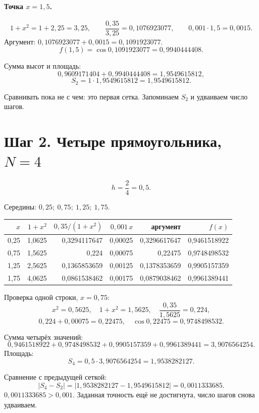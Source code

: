 \documentclass[11pt,a4paper]{article}
\begin{document}
\paragraph{Точка \(x = 1{,}5\).}
\[
1 + x^{2} = 1 + 2{,}25 = 3{,}25,
\qquad
\frac{0{,}35}{3{,}25} = 0{,}1076923077,
\qquad
0{,}001 \cdot 1{,}5 = 0{,}0015.
\]
Аргумент: \(0{,}1076923077 + 0{,}0015 = 0{,}1091923077\).
\[
f(1{,}5) = \cos 0{,}1091923077 = 0{,}9940444408.
\]

Сумма высот и площадь:
\[
0{,}9609171404 + 0{,}9940444408 = 1{,}9549615812,
\]
\[
S_{2} = 1 \cdot 1{,}9549615812 = 1{,}9549615812.
\]

Сравнивать пока не с чем: это первая сетка. Запоминаем \(S_{2}\) и удваиваем число шагов.

\section*{Шаг 2. Четыре прямоугольника, \(N = 4\)}

\[
h = \frac{2}{4} = 0{,}5.
\]

Середины: \(0{,}25;\ 0{,}75;\ 1{,}25;\ 1{,}75\).

{\small
\begin{center}
\begin{tabular}{@{}r r r r r r@{}}
\toprule
\(x\) & \(1+x^{2}\) & \(0{,}35/(1+x^{2})\) & \(0{,}001\,x\) & аргумент & \(f(x)\) \\
\midrule
0,25 & 1,0625 & 0,3294117647 & 0,00025 & 0,3296617647 & 0,9461518922 \\
0,75 & 1,5625 & 0,224 & 0,00075 & 0,22475 & 0,9748498532 \\
1,25 & 2,5625 & 0,1365853659 & 0,00125 & 0,1378353659 & 0,9905157359 \\
1,75 & 4,0625 & 0,0861538462 & 0,00175 & 0,0879038462 & 0,9961389441 \\
\bottomrule
\end{tabular}
\end{center}
}

Проверка одной строки, \(x = 0{,}75\):
\[
x^{2} = 0{,}5625,\quad 1 + x^{2} = 1{,}5625,\quad \frac{0{,}35}{1{,}5625} = 0{,}224,
\]
\[
0{,}224 + 0{,}00075 = 0{,}22475,\quad \cos 0{,}22475 = 0{,}9748498532.
\]

Сумма четырёх значений:
\[
0{,}9461518922 + 0{,}9748498532 + 0{,}9905157359 + 0{,}9961389441 = 3{,}9076564254.
\]
Площадь:
\[
S_{4} = 0{,}5 \cdot 3{,}9076564254 = 1{,}9538282127.
\]

Сравнение с предыдущей сеткой:
\[
|S_{4} - S_{2}| = |1{,}9538282127 - 1{,}9549615812| = 0{,}0011333685.
\]
\(0{,}0011333685 > 0{,}001\). Заданная точность ещё не достигнута, число шагов снова удваиваем.
\end{document}
